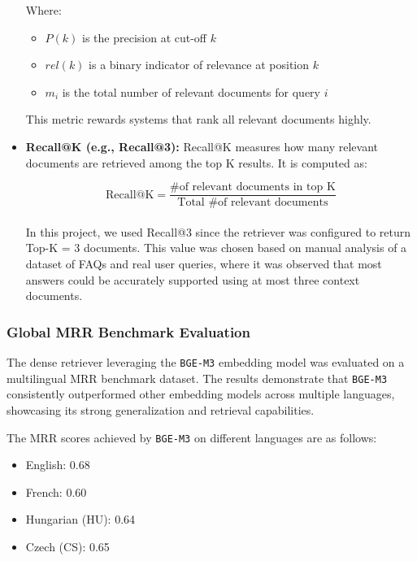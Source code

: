 \begin{itemize}
    Where:
    \begin{itemize}
        \item $P(k)$ is the precision at cut-off $k$
        \item $rel(k)$ is a binary indicator of relevance at position $k$
        \item $m_i$ is the total number of relevant documents for query $i$
    \end{itemize}
    
    This metric rewards systems that rank all relevant documents highly.

    \item \textbf{Recall@K (e.g., Recall@3):}
    Recall@K measures how many relevant documents are retrieved among the top K results. It is computed as:
    
    \begin{equation*}
    \text{Recall@K} = \frac{\text{\# of relevant documents in top K}}{\text{Total \# of relevant documents}}
    \end{equation*}
    \\
    In this project, we used Recall@3 since the retriever was configured to return Top-K = 3 documents. This value was chosen based on manual analysis of a dataset of FAQs and real user queries, where it was observed that most answers could be accurately supported using at most three context documents.
\end{itemize}

\subsubsection{Global MRR Benchmark Evaluation}
The dense retriever leveraging the \texttt{BGE-M3} embedding model was evaluated on a multilingual MRR benchmark dataset. The results demonstrate that \texttt{BGE-M3} consistently outperformed other embedding models across multiple languages, showcasing its strong generalization and retrieval capabilities.

The MRR scores achieved by \texttt{BGE-M3} on different languages are as follows:
\begin{itemize}
    \item English: 0.68
    \item French: 0.60
    \item Hungarian (HU): 0.64
    \item Czech (CS): 0.65
\end{itemize}

